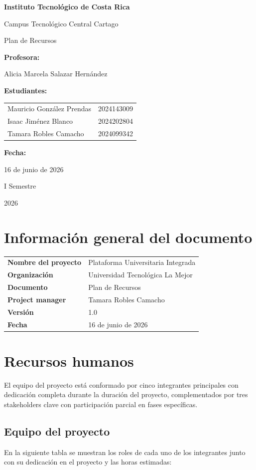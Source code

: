 \documentclass[11pt,spanish]{article}
\title{\DocumentoTitulo}
\author{\AutoresPortada}
\date{\FechaDocumento}
\makeatletter
\newcommand{\Institucion}{Instituto Tecnológico de Costa Rica}
\newcommand{\Campus}{Campus Tecnológico Central Cartago}
\newcommand{\DocumentoTitulo}{Plan de Recursos}
\newcommand{\Profesor}{Alicia Marcela Salazar Hernández}
\newcommand{\FechaDocumento}{16 de junio de 2026}
\newcommand{\PeriodoAcademico}{I Semestre}
\newcommand{\AnioDocumento}{2026}
\newcommand{\AutoresPortada}{%
    \begin{tabular}{l@{\hspace{1.5cm}}r}
        Mauricio González Prendas & 2024143009\\
        Isaac Jiménez Blanco & 2024202804\\
        Tamara Robles Camacho & 2024099342
    \end{tabular}%
}
\newcommand{\MakeCover}{%
\begin{titlepage}
\thispagestyle{empty}
\centering

{\bfseries \huge \Institucion \par}
\vspace{0.25cm}
{\LARGE \Campus \par}

\vfill

{\huge \DocumentoTitulo \par}


\vfill

{\bfseries \LARGE Profesora: \par}
{\Large \Profesor \par}

\vfill

{\bfseries \LARGE Estudiantes: \par}
{\Large \AutoresPortada \par}

\vfill

{\bfseries\LARGE Fecha: \par}
{\Large \FechaDocumento \par}

\vfill

{\LARGE \PeriodoAcademico \par}
{\LARGE \AnioDocumento \par}

\end{titlepage}%
}
\makeatother
\begin{document}
\hypersetup{pageanchor=false}

\MakeCover

\pagestyle{empty}
\tableofcontents
\clearpage
{}
\hypersetup{pageanchor=true}
\pagestyle{fancy}

\section{Información general del documento}

\begin{table}[H]
\centering
\begin{tabularx}{\textwidth}{p{5cm} Y}
\toprule
\textbf{Nombre del proyecto} & Plataforma Universitaria Integrada \\
\textbf{Organización} & Universidad Tecnológica La Mejor \\
\textbf{Documento} & \DocumentoTitulo \\
\textbf{Project manager} & Tamara Robles Camacho \\
\textbf{Versión} & 1.0 \\
\textbf{Fecha} & \FechaDocumento \\
\bottomrule
\end{tabularx}
\end{table}

\section{Recursos humanos}

El equipo del proyecto está conformado por cinco integrantes principales con dedicación completa durante la duración del proyecto, complementados por tres stakeholders clave con participación parcial en fases específicas.

\subsection{Equipo del proyecto}

En la siguiente tabla se muestran los roles de cada uno de los integrantes junto con su dedicación en el proyecto y las horas estimadas:
\end{document}
